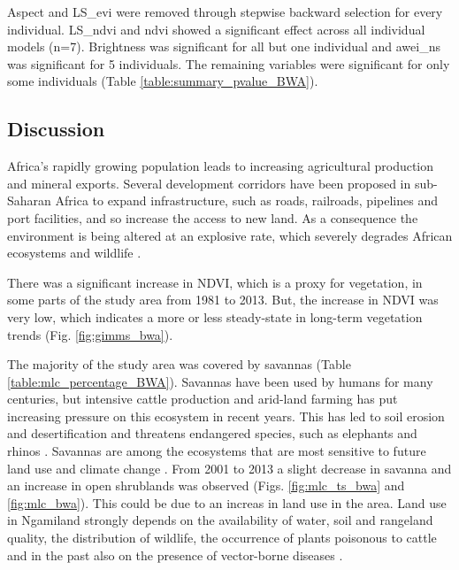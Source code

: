 \documentclass[12pt,a4paper, twoside, english]{article}
\begin{document}
Aspect and LS\_evi were removed through stepwise backward selection for every individual. LS\_ndvi and ndvi showed a significant effect across all individual models (n=7). Brightness was significant for all but one individual and awei\_ns was significant for 5 individuals. The remaining variables were significant for only some individuals (Table \ref{table:summary_pvalue_BWA}).



\subsection{Discussion}


Africa's rapidly growing population leads to increasing agricultural production and mineral exports. Several development corridors have been proposed in sub-Saharan Africa to expand infrastructure, such as roads, railroads, pipelines and port facilities, and so increase the access to new land. As a consequence the environment is being altered at an explosive rate, which severely degrades African ecosystems and wildlife \citep{Laurance2015}. 

There was a significant increase in NDVI, which is a proxy for vegetation, in some parts of the study area from 1981 to 2013. But, the increase in NDVI was very low, which indicates a more or less steady-state in long-term vegetation trends (Fig. \ref{fig:gimms_bwa}). 

The majority of the study area was covered by savannas (Table \ref{table:mlc_percentage_BWA}). Savannas have been used by humans for many centuries, but intensive cattle production and arid-land farming has put increasing pressure on this ecosystem in recent years. This has led to soil erosion and desertification and threatens endangered species, such as elephants and rhinos \citep{Young1997a}. Savannas are among the ecosystems that are most sensitive to future land use and climate change \citep{DeKnegt2008}. From 2001 to 2013 a slight decrease in savanna and an increase in open shrublands was observed (Figs. \ref{fig:mlc_ts_bwa} and \ref{fig:mlc_bwa}). This could be due to an  increas in land use in the area. Land use in Ngamiland strongly depends on the availability of water, soil and rangeland quality, the distribution of wildlife, the occurrence of plants poisonous to cattle and in the past also on the presence of vector-borne diseases \citep{Kgathi2014}.
\end{document}
